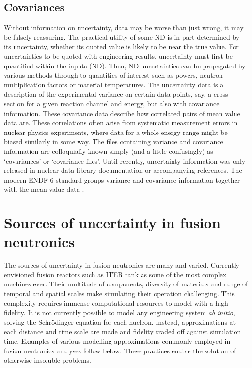 \subsection{Covariances}
Without information on uncertainty, data may be worse than just wrong, it may be falsely reassuring. The practical utility of some ND is in part determined by its uncertainty, whether its quoted value is likely to be near the true value. For uncertainties to be quoted with engineering results, uncertainty must first be quantified within the inputs (ND). Then, ND uncertainties can be propagated by various methods through to quantities of interest such as powers, neutron multiplication factors or material temperatures. The uncertainty data is a description of the experimental variance on certain data points, say, a cross-section for a given reaction channel and energy, but also with covariance information. These covariance data describe how correlated pairs of mean value data are. These correlations often arise from systematic measurement errors in nuclear physics experiments, where data for a whole energy range might be biased similarly in some way. The files containing variance and covariance information are colloquially known simply (and a little confusingly) as `covariances' or `covariance files'. Until recently, uncertainty information was only released in nuclear data library documentation or accompanying references. The modern ENDF-6 standard groups variance and covariance information together with the mean value data \cite{ENDF-6}. 

\section{Sources of uncertainty in fusion neutronics}
The sources of uncertainty in fusion neutronics are many and varied. Currently envisioned fusion reactors such as ITER rank as some of the most complex machines ever. Their multitude of components, diversity of materials and range of temporal and spatial scales make simulating their operation challenging. This complexity requires immense computational resources to model with a high fidelity. It is not currently possible to model any engineering system \textit{ab initio}, solving the Schr{\"o}dinger equation for each nucleon. Instead, approximations at each distance and time scale are made and fidelity traded off against simulation time. Examples of various modelling approximations commonly employed in fusion neutronics analyses follow below. These practices enable the solution of otherwise insoluble problems.  


